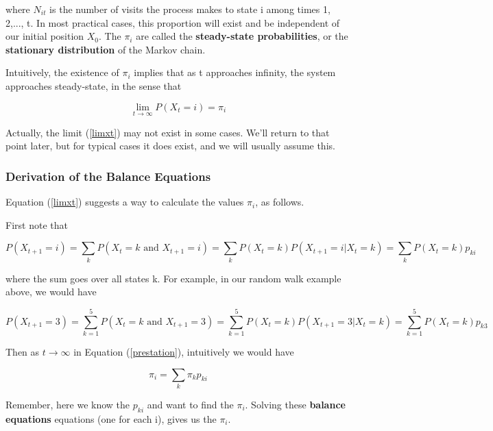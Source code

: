 where $N_{it}$ is the number of visits the process makes to state i
among times 1, 2,..., t. In most practical cases, this proportion will
exist and be independent of our initial position $X_{0}$.  The $\pi_i$
are called the {\bf steady-state probabilities}, or the {\bf stationary
distribution} of the Markov chain.

Intuitively, the existence of $\pi_{i}$ implies that as t approaches
infinity, the system approaches steady-state, in the sense that

\begin{equation}
\label{limxt}
\lim_{t\rightarrow \infty }P(X_{t}=i)=\pi_{i}
\end{equation}

Actually, the limit (\ref{limxt}) may not exist in some cases.  We'll
return to that point later, but for typical cases it does exist, and we
will usually assume this.  

\subsubsection{Derivation of the Balance Equations}
\label{baleqns}

Equation (\ref{limxt}) suggests a way to calculate the values $\pi_{i}$,
as follows.

First note that

\begin{equation}
\label{prestation}
P(X_{t+1}=i)
= \sum_{k} P(X_{t}=k \textrm{ and } X_{t+1}=i)
= \sum_{k} P(X_{t}=k) P(X_{t+1}=i | X_t = k)
= \sum_{k} P(X_{t}=k)p_{ki}
\end{equation}

where the sum goes over all states k.  For example, in our random walk
example above, we would have

\begin{equation}
P(X_{t+1}=3)
= \sum_{k=1}^5 P(X_{t}=k \textrm{ and } X_{t+1}=3)
= \sum_{k=1}^5 P(X_{t}=k) P(X_{t+1}=3 | X_t = k)
= \sum_{k=1}^5 P(X_{t}=k)p_{k3}
\end{equation}

Then as $t\rightarrow \infty $ in Equation (\ref{prestation}),
intuitively we would have  

\begin{equation}
\label{balance}
\pi_{i}=\sum_{k}\pi_{k}p_{ki}
\end{equation}

Remember, here we know the $p_{ki}$ and want to find the $\pi_i$.
Solving these {\bf balance equations} equations (one for each i), gives
us the $\pi_i$.

